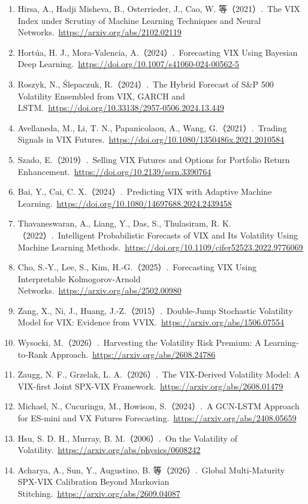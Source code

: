 \documentclass[11pt,a4paper]{article}
\begin{document}
\begin{enumerate}[leftmargin=2.2em]
  \item Hirsa, A., Hadji Misheva, B., Osterrieder, J., Cao, W. 等（2021）.\ The VIX Index under Scrutiny of Machine Learning Techniques and Neural Networks.\ \url{https://arxiv.org/abs/2102.02119}
  \item Hortúa, H. J., Mora-Valencia, A.（2024）.\ Forecasting VIX Using Bayesian Deep Learning.\ \url{https://doi.org/10.1007/s41060-024-00562-5}
  \item Roszyk, N., Ślepaczuk, R.（2024）.\ The Hybrid Forecast of S\&P 500 Volatility Ensembled from VIX, GARCH and LSTM.\ \url{https://doi.org/10.33138/2957-0506.2024.13.449}
  \item Avellaneda, M., Li, T. N., Papanicolaou, A., Wang, G.（2021）.\ Trading Signals in VIX Futures.\ \url{https://doi.org/10.1080/1350486x.2021.2010584}
  \item Szado, E.（2019）.\ Selling VIX Futures and Options for Portfolio Return Enhancement.\ \url{https://doi.org/10.2139/ssrn.3390764}
  \item Bai, Y., Cai, C. X.（2024）.\ Predicting VIX with Adaptive Machine Learning.\ \url{https://doi.org/10.1080/14697688.2024.2439458}
  \item Thavaneswaran, A., Liang, Y., Das, S., Thulasiram, R. K.（2022）.\ Intelligent Probabilistic Forecasts of VIX and Its Volatility Using Machine Learning Methods.\ \url{https://doi.org/10.1109/cifer52523.2022.9776069}
  \item Cho, S.-Y., Lee, S., Kim, H.-G.（2025）.\ Forecasting VIX Using Interpretable Kolmogorov-Arnold Networks.\ \url{https://arxiv.org/abs/2502.00980}
  \item Zang, X., Ni, J., Huang, J.-Z.（2015）.\ Double-Jump Stochastic Volatility Model for VIX: Evidence from VVIX.\ \url{https://arxiv.org/abs/1506.07554}
  \item Wysocki, M.（2026）.\ Harvesting the Volatility Risk Premium: A Learning-to-Rank Approach.\ \url{https://arxiv.org/abs/2608.24786}
  \item Zaugg, N. F., Grzelak, L. A.（2026）.\ The VIX-Derived Volatility Model: A VIX-first Joint SPX-VIX Framework.\ \url{https://arxiv.org/abs/2608.01479}
  \item Michael, N., Cucuringu, M., Howison, S.（2024）.\ A GCN-LSTM Approach for ES-mini and VX Futures Forecasting.\ \url{https://arxiv.org/abs/2408.05659}
  \item Hsu, S. D. H., Murray, B. M.（2006）.\ On the Volatility of Volatility.\ \url{https://arxiv.org/abs/physics/0608242}
  \item Acharya, A., Sun, Y., Augustino, B. 等（2026）.\ Global Multi-Maturity SPX-VIX Calibration Beyond Markovian Stitching.\ \url{https://arxiv.org/abs/2609.04087}

\end{enumerate}
\end{document}
